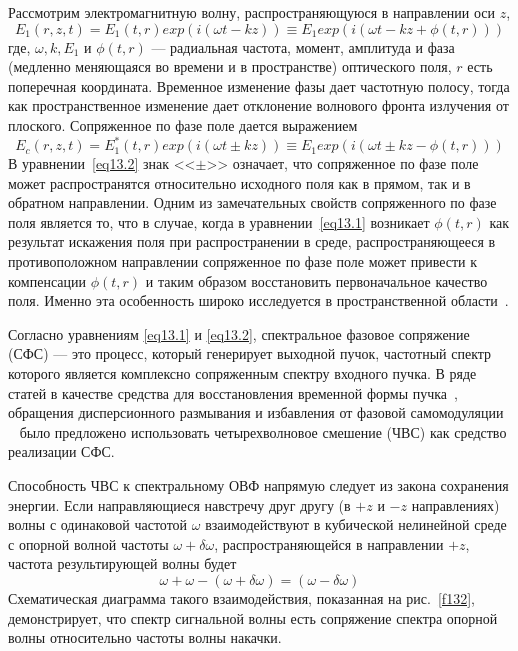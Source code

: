 
Рассмотрим электромагнитную волну, распространяющуюся в направлении
оси $z$,
\begin{equation}\label{eq13.1}
    E_1(r,z,t) = E_1(t,r) exp(i(\omega t - kz)) \equiv E_1
    exp(i(\omega t - kz + \phi(t,r)))
\end{equation}
где, $\omega, k, E_1$ и $\phi(t,r)$ --- радиальная частота, момент,
амплитуда и фаза (медленно меняющаяся во времени и в пространстве)
оптического поля, $r$ есть поперечная координата. Временное
изменение фазы дает частотную полосу, тогда как пространственное
изменение дает отклонение волнового фронта излучения от плоского.
Сопряженное по фазе поле дается выражением
\begin{equation}\label{eq13.2}
    E_c(r,z,t) = E_1^{\ast}(t,r) exp(i(\omega t \pm kz)) \equiv E_1
    exp(i(\omega t \pm kz - \phi(t,r)))
\end{equation}
В уравнении~\eqref{eq13.2} знак <<$\pm$>> означает, что сопряженное по
фазе поле может распространятся относительно исходного поля как в
прямом, так и в обратном направлении. Одним из замечательных свойств
сопряженного по фазе поля является то, что в случае, когда в
уравнении~\eqref{eq13.1} возникает $\phi(t,r)$ как результат
искажения поля при распространении в среде, распространяющееся в
противоположном направлении сопряженное по фазе поле может привести
к компенсации $\phi(t,r)$ и таким образом восстановить
первоначальное качество поля. Именно эта особенность широко
исследуется в пространственной области~\cite{1313}.

Согласно уравнениям \eqref{eq13.1} и \eqref{eq13.2}, спектральное
фазовое сопряжение (СФС) --- это процесс, который генерирует
выходной пучок, частотный спектр которого является комплексно
сопряженным спектру входного пучка. В ряде статей в качестве
средства для восстановления временной формы пучка~\cite{1314,1315},
обращения дисперсионного размывания и избавления от фазовой
самомодуляции ~\cite{1312,1316,1317,1318} было предложено
использовать четырехволновое смешение (ЧВС) как средство реализации
СФС.

Способность ЧВС к спектральному ОВФ напрямую следует из закона
сохранения энергии. Если направляющиеся навстречу друг другу (в $+z$
и $-z$ направлениях) волны с одинаковой частотой $\omega$
взаимодействуют в кубической нелинейной среде с опорной волной
частоты $\omega + \delta\omega$, распространяющейся в направлении
$+z$, частота результирующей волны будет
\begin{equation}\label{omega}
    \omega+\omega-(\omega+\delta\omega) = (\omega-\delta\omega)
\end{equation}
Схематическая диаграмма такого взаимодействия, показанная на рис.~\ref{f132},
демонстрирует, что спектр сигнальной волны есть
сопряжение спектра опорной волны относительно частоты волны накачки.


